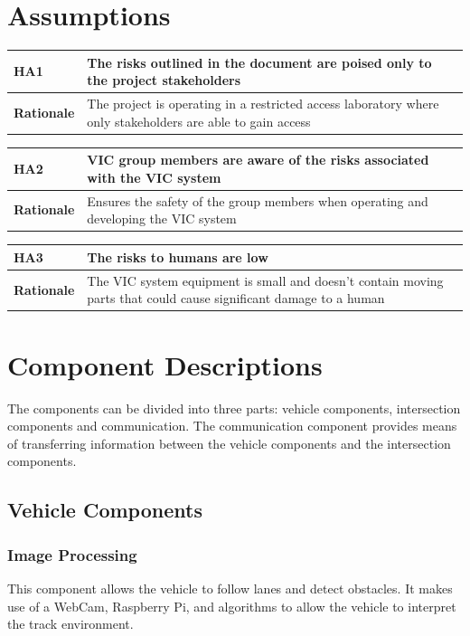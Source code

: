 \documentclass [10pt]{article}
\begin{document}
\section{Assumptions}

\begin{longtable}{| p{ } | p{ } | }\hline 
\rowcolor{tableCell}\textbf{HA1} & The risks outlined in the document are poised only to the project stakeholders \\ \hline
\textbf{Rationale} & The project is operating in a restricted access laboratory where only stakeholders are able to gain access  \\ \hline 
\end{longtable}

\begin{longtable}{| p{ } | p{ } | }\hline 
\rowcolor{tableCell}\textbf{HA2} & VIC group members are aware of the risks associated with the VIC system  \\ \hline
\textbf{Rationale} & Ensures the safety of the group members when operating and developing the VIC system  \\ \hline 
\end{longtable}


\begin{longtable}{| p{ } | p{ } | }\hline 
\rowcolor{tableCell}\textbf{HA3} & The risks to humans are low  \\ \hline
\textbf{Rationale} & The VIC system equipment is small and doesn't contain moving parts that could cause significant damage to a human   \\ \hline 
\end{longtable}




\section{Component Descriptions} 
The components can be divided into three parts: vehicle components,  intersection components and communication. The communication component provides means of transferring information between the vehicle components and the intersection components.

\subsection{Vehicle Components}
\subsubsection{Image Processing}
This component allows the vehicle to follow lanes and detect obstacles. It makes use of a WebCam, Raspberry Pi, and algorithms to allow the vehicle to interpret the track environment. 
\end{document}
